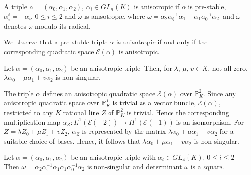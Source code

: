\begin{dfn}\label{dfn3.1}
A triple $\alpha=(\alpha_0,\alpha_1,\alpha_2)$, $\alpha_i\in GL_n(K)$ is anisotropic if $\alpha$ is pre-stable, $\alpha^{t}_i=-\alpha_i$, $0\leq i\leq 2$ and $\widetilde{\omega}$ is anisotropic, where $\omega=\alpha_2\alpha^{-1}_0\alpha_{1}-\alpha_1\alpha_0^{-1}\alpha_2$, and $\widetilde{\omega}$ denotes $\omega$ modulo its radical. 

We observe that a pre-stable triple $\alpha$ is anisotropic if and only if the corresponding quadratic space $\mathscr{E}(\alpha)$ is anisotropic. 
\end{dfn}


\begin{lem}\label{lem3.2}
Let $\alpha=(\alpha_0,\alpha_1,\alpha_2)$ be an anisotropic triple. Then, for $\lambda$, $\mu$, $v\in K$, not all zero, $\lambda \alpha_0+\mu\alpha_1+v\alpha_2$ is non-singular.  
\end{lem}

\begin{Proof}
The triple $\alpha$ defines an anisotropic quadratic space $\mathscr{E}(\alpha)$ over $\mathbb{P}^{2}_K$. Since any anisotropic quadratic space over $\mathbb{P}^{1}_K$ is trivial as a vector bundle, $\mathscr{E}(\alpha)$, restricted to any $K$ rational line $Z$ of $\mathbb{P}^{2}_K$ is trivial. Hence the corresponding multiplication map $\alpha_Z:H^{1}(\mathscr{E}(-2))\to H^{1}(\mathscr{E}(-1))$ is an isomorphism. For $Z=\lambda Z_0+\mu Z_1+v Z_2$, $\alpha_Z$ is represented by the matrix $\lambda\alpha_0+\mu\alpha_1+v\alpha_2$ for a suitable choice of bases. Hence, it follows that $\lambda \alpha_0+\mu\alpha_1+v\alpha_2$ is non-singular. 
\end{Proof}


\begin{Prop}\label{Prop3.3}
Let $\alpha=(\alpha_0, \alpha_1, \alpha_2)$ be an anisotropic triple with $\alpha_i\in GL_4(K)$, $0\leq i\leq 2$. Then $\omega=\alpha_2\alpha^{-1}_0\alpha_1\alpha_1 \alpha^{-1}_0\alpha_2$ is non-singular and determinant $\omega$ is a square.
\end{Prop}

